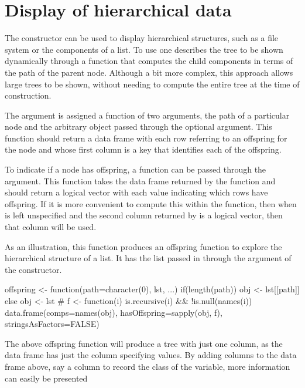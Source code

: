 \section{Display of hierarchical data}
\label{sec:gWidgets-displ-heir-data}

The  constructor can be used to display
hierarchical structures, such as a file system or the components of a
list. To use  one describes the tree to be shown
dynamically through a function that computes the child components in
terms of the path of the parent node. Although a bit more complex,
this approach allows large trees to be shown, without needing to
compute the entire tree at the time of construction.

The  argument is assigned a function of two
arguments, the path of a particular node and the arbitrary object
passed through the optional 
argument. This function should return a data frame with each row
referring to an offspring for the node and whose first column is a key
that identifies each of the offspring.

To indicate if a node has offspring, a function can be passed through
the  argument. This function takes the
data frame returned by the  function and should return
a logical vector with each value indicating which rows have
offspring. If it is more convenient to compute this within the
 function, then when  is left
unspecified and the second column returned by  is a
logical vector, then that column will be used.

As an illustration, this function produces an offspring function to
explore the hierarchical structure of a list. It has the list passed
in through the
 argument of the constructor.
\begin{Schunk}
\begin{Sinput}
 offspring <- function(path=character(0), lst, ...) {
   if(length(path))
     obj <- lst[[path]]
   else
       obj <- lst
   #
   f <- function(i) is.recursive(i) && !is.null(names(i))
   data.frame(comps=names(obj), 
              hasOffspring=sapply(obj, f),
              stringsAsFactors=FALSE)
 }
\end{Sinput}
\end{Schunk}
%
The above offspring function will produce a tree with just one column,
as the data frame has just the  column specifying
values. By adding columns to the data frame above, say a column to
record the class of the variable, more information can easily be
presented


